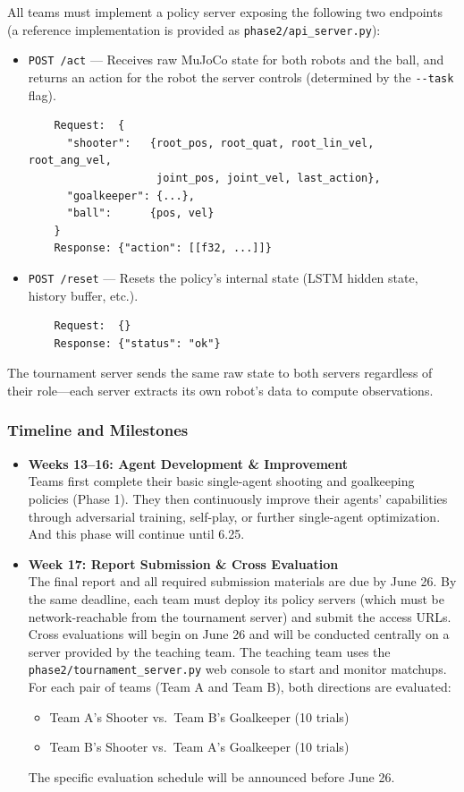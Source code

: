 \documentclass{article}
\begin{document}
All teams must implement a policy server exposing the following two endpoints (a reference implementation is provided as \texttt{phase2/api\_server.py}):

\begin{itemize}
    \item \texttt{POST /act} --- Receives raw MuJoCo state for both robots and the ball, and returns an action for the robot the server controls (determined by the \texttt{-\/-task} flag).
    \begin{verbatim}
    Request:  {
      "shooter":   {root_pos, root_quat, root_lin_vel, root_ang_vel,
                    joint_pos, joint_vel, last_action},
      "goalkeeper": {...},
      "ball":      {pos, vel}
    }
    Response: {"action": [[f32, ...]]}\end{verbatim}
    \item \texttt{POST /reset} --- Resets the policy's internal state (LSTM hidden state, history buffer, etc.).
    \begin{verbatim}
    Request:  {}
    Response: {"status": "ok"}\end{verbatim}
\end{itemize}

The tournament server sends the same raw state to both servers regardless of their role---each server extracts its own robot's data to compute observations.

\subsubsection{Timeline and Milestones}
\begin{itemize}
    \item \textbf{Weeks 13--16: Agent Development \& Improvement} \\
    Teams first complete their basic single-agent shooting and goalkeeping policies (Phase 1). They then continuously improve their agents' capabilities through adversarial training, self-play, or further single-agent optimization. And this phase will continue until 6.25.

    \item \textbf{Week 17: Report Submission \& Cross Evaluation} \\
    The final report and all required submission materials are due by June 26. By the same deadline, each team must deploy its policy servers (which must be network-reachable from the tournament server) and submit the access URLs. Cross evaluations will begin on June 26 and will be conducted centrally on a server provided by the teaching team. The teaching team uses the \texttt{phase2/tournament\_server.py} web console to start and monitor matchups. For each pair of teams (Team A and Team B), both directions are evaluated:
    \begin{itemize}
        \item Team A's Shooter vs.\ Team B's Goalkeeper (10 trials)
        \item Team B's Shooter vs.\ Team A's Goalkeeper (10 trials)
    \end{itemize}
    The specific evaluation schedule will be announced before June 26.
\end{itemize}
\end{document}
